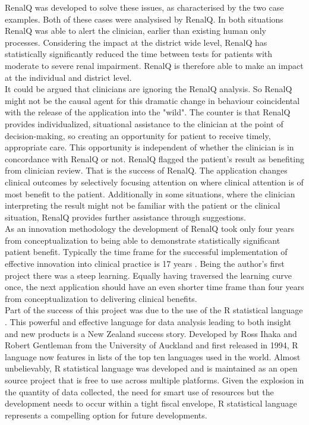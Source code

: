 ﻿\documentclass[11pt]{article}
\begin{document}
RenalQ was developed to solve these issues, as characterised by the two case examples. Both of these cases were analysised by RenalQ. In both situations RenalQ was able to alert the clinician, earlier than existing human only processes. Considering the impact at the district wide level, RenalQ has statistically significantly reduced the time between tests for patients with moderate to severe renal impairment. RenalQ is therefore able to make an impact at the individual and district level. \\

It could be argued that clinicians are ignoring the RenalQ analysis. So RenalQ might not be the causal agent for this dramatic change in behaviour coincidental with the release of the application into the "wild". The counter is that RenalQ provides individualized, situational assistance to the clinician at the point of decision-making, so creating an opportunity for patient to receive timely, appropriate care. This opportunity is independent of whether the clinician is in concordance with RenalQ or not. RenalQ flagged the patient's result as benefiting from clinician review. That is the success of RenalQ.  The application changes clinical outcomes by selectively focusing attention on where clinical attention is of most benefit to the patient.  Additionally in some situations, where the clinician interpreting the result might not be familiar with the patient or the clinical situation, RenalQ provides further assistance through suggestions. \\ 

As an innovation methodology the development of RenalQ took only four years from conceptualization to being able to demonstrate statistically significant patient benefit. Typically the time frame for the successful implementation of effective innovation into clinical practice is 17 years \citep{morris2011answer}. Being the author's first project there was a steep learning. Equally having traversed the learning curve once, the next application should have an even shorter time frame than four years from conceptualization to delivering clinical benefits. \\

Part of the success of this project was due to the use of the R statistical language \citep{rstat2013}. This powerful and effective language for data analysis leading to both insight and new products is a New Zealand success story. Developed by Ross Ihaka and Robert Gentleman from the University of Auckland and first released in 1994, R language now features in lists of the top ten languages used in the world. Almost unbelievably, R statistical language was developed and is maintained as an open source project that is free to use across multiple platforms. Given the explosion in the quantity of data collected, the need for smart use of resources but the development needs to occur within a tight fiscal envelope, R statistical language represents a compelling option for future developments. \\
\end{document}
